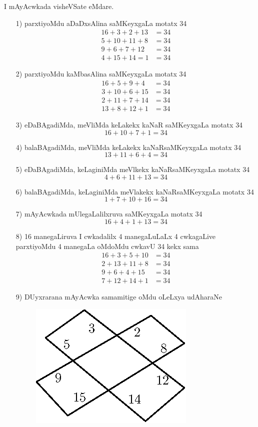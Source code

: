 I mAyAcwkada visheVSate eMdare.
\begin{enumerate}
\item[{\rm 1)}] parxtiyoMdu aDaDxsAlina saMKeyxgaLa motatx {\rm 34}
\begin{align*}
16+3+2+13 &=34\\
5+10+11+8 &=34\\
9+6+7+12 & =34\\
4+15+14=1 &=34
\end{align*}
\item[{\rm 2)}] parxtiyoMdu kaMbasAlina saMKeyxgaLa motatx {\rm 34}
\begin{align*}
16+5+9+4 &=34\\
3+10+6+15 &=34\\
2+11+7+14 & =34\\
13+8+12+1 &=34
\end{align*}
\item[{\rm 3)}] eDaBAgadiMda, meVliMda keLakekx kaNaR saMKeyxgaLa motatx {\rm 34}
$$
16+10+7+1=34
$$
\item[{\rm 4)}] balaBAgadiMda, meVliMda keLakekx kaNaRsaMKeyxgaLa motatx {\rm 34}
$$
13+11+6+4 =34
$$
\item[{\rm 5)}] eDaBAgadiMda, keLaginiMda meVlkekx kaNaRsaMKeyxgaLa motatx {\rm 34}
$$
4+6+11+13=34
$$
\item[{\rm 6)}] balaBAgadiMda, keLaginiMda meVlakekx kaNaRsaMKeyxgaLa motatx {\rm 34}
$$
1+7+10+16=34
$$
\item[{\rm 7)}] mAyAcwkada mUlegaLalilxruva saMKeyxgaLa motatx {\rm 34}
$$
16+4+1+13=34
$$ 
\item[{\rm 8)}] {\rm 16} manegaLiruva I cwkadalilx {\rm 4} manegaLuLaLx {\rm 4} cwkagaLive parxtiyoMdu {\rm 4} manegaLa oMdoMdu cwkavU {\rm 34} kekx sama
\begin{align*}
16+3+5+10 &=34\\
2+13+11+8 &=34\\
9+6+4+15 & =34\\
7+12+14+1 &=34
\end{align*}
\item[{\rm 9)}] DUyxrarana mAyAcwka samamitige oMdu oLeLxya udAharaNe
\begin{figure}[H]
\centering
\includegraphics[scale=.8]{src/figures/m_121.eps}
\end{figure}


\end{enumerate}
